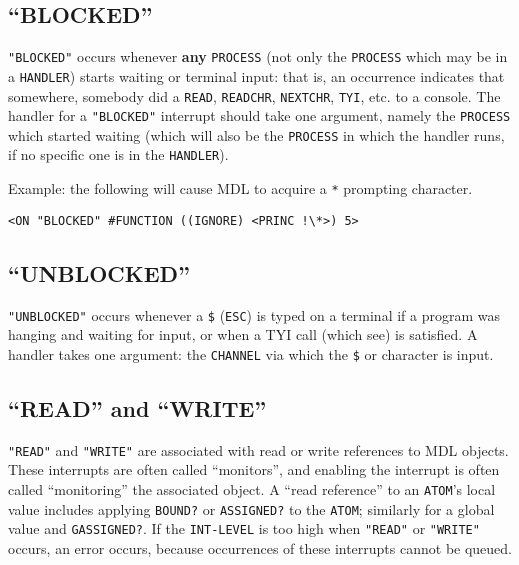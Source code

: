 \documentclass[a4paper]{scrbook}
\begin{document}
\subsection{\texorpdfstring{``BLOCKED''}{21.8.7. BLOCKED}}\label{blocked}

\texttt{"BLOCKED"}  occurs whenever \textbf{any} \texttt{PROCESS} (not only the
\texttt{PROCESS} which may be in a \texttt{HANDLER}) starts waiting or terminal input: that is, an occurrence indicates
that somewhere, somebody did a \texttt{READ}, \texttt{READCHR},
\texttt{NEXTCHR}, \texttt{TYI}, etc. to a console. The handler for a
\texttt{"BLOCKED"} interrupt should take one argument, namely the \texttt{PROCESS} which started waiting (which will also
be the \texttt{PROCESS} in which the handler runs, if no specific one is in the \texttt{HANDLER}).

Example: the following will cause MDL to acquire a \texttt{*} prompting character.

\begin{verbatim}
<ON "BLOCKED" #FUNCTION ((IGNORE) <PRINC !\*>) 5>
\end{verbatim}

\subsection{\texorpdfstring{``UNBLOCKED''}{21.8.8. UNBLOCKED}}\label{unblocked}

\texttt{"UNBLOCKED"}  occurs whenever a \texttt{\$} \index{\texttt{\$}} (\texttt{ESC})
is typed on a terminal if a program was hanging and waiting for input, or when a TYI call (which see)
is satisfied. A handler takes one argument: the \texttt{CHANNEL} via which the \texttt{\$} or character is input.

\subsection{\texorpdfstring{``READ'' and ``WRITE''}{21.8.9. READ and WRITE}}\label{read-and-write}

\texttt{"READ"}  and \texttt{"WRITE"}  are associated with
read or write references to MDL objects. These interrupts are often called ``monitors'', and enabling the interrupt is
often called ``monitoring'' the associated object. A ``read reference'' to an \texttt{ATOM}'s local value includes applying
\texttt{BOUND?} or \texttt{ASSIGNED?} to the \texttt{ATOM}; similarly for
a global value and \texttt{GASSIGNED?}. If the \texttt{INT-LEVEL} is too high when
\texttt{"READ"} or \texttt{"WRITE"} occurs, an error occurs, because occurrences of these interrupts cannot be queued.
\end{document}
